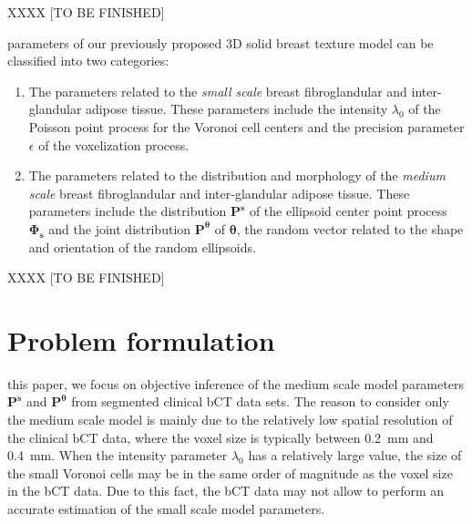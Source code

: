 \documentclass[journal]{IEEEtran}
\begin{document}
XXXX [TO BE FINISHED]

 parameters of our previously proposed 3D solid
breast texture model can be classified into two categories:

\begin{enumerate}

\item The parameters related to the \textit{small scale} breast
  fibroglandular and inter-glandular adipose tissue. These parameters
  include the intensity $\lambda_0$ of the Poisson point process for
  the Voronoi cell centers and the precision parameter $\epsilon$ of
  the voxelization process.

\item The parameters related to the distribution and morphology of the
  \textit{medium scale} breast fibroglandular and inter-glandular
  adipose tissue. These parameters include the distribution
  $\mathbf{P}^{\mathbf{s}}$ of the ellipsoid center point process
  $\mathbf{\Phi_s}$ and the joint distribution
  $\mathbf{P}^{\boldsymbol{\theta}}$ of $\boldsymbol{\theta}$, the
  random vector related to the shape and orientation of the random
  ellipsoids.

\end{enumerate}

XXXX [TO BE FINISHED]

\section{Problem formulation}
\label{sec:problem-statement}


 this paper, we focus on objective inference of the
medium scale model parameters $\mathbf{P}^{\mathbf{s}}$ and
$\mathbf{P}^{\boldsymbol{\theta}}$ from segmented clinical bCT data
sets. The reason to consider only the medium scale model is mainly due
to the relatively low spatial resolution of the clinical bCT data,
where the voxel size is typically between \SI{0.2}{\mm} and
\SI{0.4}{\mm}. When the intensity parameter $\lambda_0$ has a relatively
large value, the size of the small Voronoi cells may be in the same
order of magnitude as the voxel size in the bCT data. Due to this
fact, the bCT data may not allow to perform an accurate estimation of
the small scale model parameters.
\end{document}
